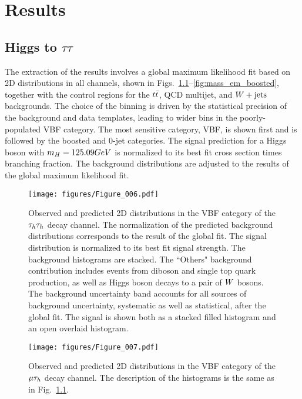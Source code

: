 \chapter{Results}

\section{Higgs to $\tau\tau$}

The extraction of the results involves a global maximum likelihood fit based on 2D distributions in all channels, shown in Figs.~\ref{fig:mass_tt_0jet}--\ref{fig:mass_em_boosted}, together with the control regions for the
$t\bar{t}$, QCD multijet, and $W +\text{jets}$ backgrounds. The choice of the binning is driven by the statistical precision of the background and data templates, leading to wider bins in the poorly-populated VBF category. The most sensitive category, VBF, is shown first and is followed by the boosted and 0-jet categories.
The signal prediction for a Higgs boson with $m_{H} = 125.09GeV$ is normalized to its best fit cross section times branching fraction.
The background distributions are adjusted to the results of the global maximum likelihood fit.

\begin{figure*}[htbp]
\centering
     \texttt{[image: figures/Figure\_006.pdf]}
     \caption{Observed and predicted 2D distributions in the VBF category of the $\tau_{h}\tau_{h}$ decay channel.
The normalization of the predicted background distributions corresponds to the result of the global fit.
The signal distribution is normalized to its best fit signal strength. The background histograms are stacked. The ``Others" background contribution includes events from diboson and single top quark production, as well as Higgs boson decays to a pair of $W$ bosons. The background uncertainty band accounts for all sources of background uncertainty, systematic as well as statistical, after the global fit. The signal is shown both as a stacked filled histogram and an open overlaid histogram.}
     \label{fig:mass_tt_0jet}
\end{figure*}

\begin{figure*}[htbp]
\centering
     \texttt{[image: figures/Figure\_007.pdf]}
     \caption{Observed and predicted 2D distributions in the VBF category of the $\mu\tau_{h}$ decay channel. The description of the histograms is the same as in Fig.~\ref{fig:mass_tt_0jet}.}
     \label{fig:mass_tt_vbf}
\end{figure*}


